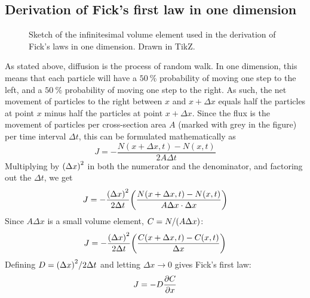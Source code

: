 \subsection{Derivation of Fick's first law in one dimension}
\begin{figure}[H]
    \centering
    \caption{Sketch of the infinitesimal volume element used in the derivation of Fick's laws in one dimension. Drawn in TikZ.}\label{fig:fick}
\end{figure}

As stated above, diffusion is the process of random walk. In one dimension, this means that each particle will have a \(\SI{50}{\percent}\) probability of moving one step to the left, and a \(\SI{50}{\percent}\) probability of moving one step to the right. As such, the net movement of particles to the right between \(x\) and \(x+\Delta x\) equals half the particles at point \(x\) minus half the particles at point \(x+\Delta x\). Since the flux is the movement of particles per cross-section area \(A\) (marked with grey in the figure) per time interval \(\Delta t\), this can be formulated mathematically as
\[
    J = -\frac{N(x+\Delta x, t) - N(x,t)}{2A\Delta t}
\]
Multiplying by \(\qty(\Delta x)^2\) in both the numerator and the denominator, and factoring out the \(\Delta t\), we get
\[
    J = -\frac{\qty(\Delta x)^2}{2\Delta t}\qty(\frac{N(x+\Delta x,t) - N(x,t)}{A\Delta x\cdot\Delta x})
\]
Since \(A\Delta x\) is a small volume element, \(C=N/\qty(A\Delta x)\):
\[
    J = -\frac{\qty(\Delta x)^2}{2\Delta t} \qty(\frac{C(x+\Delta x,t) - C(x,t)}{\Delta x})
\]
Defining \(D=\qty(\Delta x)^2/2\Delta t\) and letting \(\Delta x\to0\) gives Fick's first law:
\[
    J = -D\pdv{C}{x}
\]


